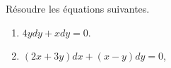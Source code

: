 \begin{exercice}\label{exoEquaDiff0002}

Résoudre les équations suivantes.
\begin{enumerate}

\item
$4ydy+xdy=0$.
\item
$(2x+3y)dx+(x-y)dy=0$,

\end{enumerate}


\end{exercice}
